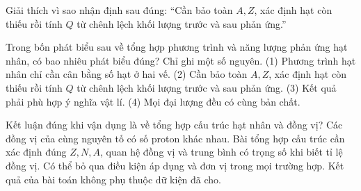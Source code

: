 \begin{bt}
Giải thích vì sao nhận định sau đúng: “Cần bảo toàn $A,Z$, xác định hạt còn thiếu rồi tính $Q$ từ chênh lệch khối lượng trước và sau phản ứng.”
\end{bt}

\begin{ex}
Trong bốn phát biểu sau về tổng hợp phương trình và năng lượng phản ứng hạt nhân, có bao nhiêu phát biểu đúng? Chỉ ghi một số nguyên. (1) Phương trình hạt nhân chỉ cần cân bằng số hạt ở hai vế. (2) Cần bảo toàn $A,Z$, xác định hạt còn thiếu rồi tính $Q$ từ chênh lệch khối lượng trước và sau phản ứng. (3) Kết quả phải phù hợp ý nghĩa vật lí. (4) Mọi đại lượng đều có cùng bản chất.
\end{ex}

\begin{ex}
Kết luận đúng khi vận dụng là về tổng hợp cấu trúc hạt nhân và đồng vị?
\choice
{Các đồng vị của cùng nguyên tố có số proton khác nhau.}
{\True Bài tổng hợp cấu trúc cần xác định đúng $Z,N,A$, quan hệ đồng vị và trung bình có trọng số khi biết tỉ lệ đồng vị.}
{Có thể bỏ qua điều kiện áp dụng và đơn vị trong mọi trường hợp.}
{Kết quả của bài toán không phụ thuộc dữ kiện đã cho.}
\end{ex}

